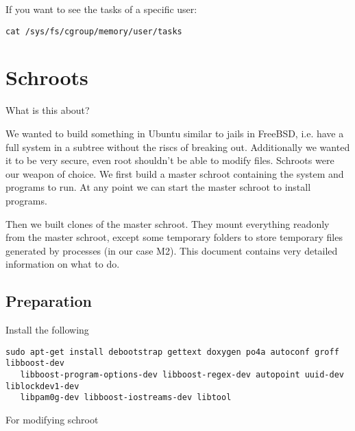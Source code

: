 \documentclass[a4paper]{book}
\begin{document}
If you want to see the tasks of a specific user:
\begin{verbatim}
cat /sys/fs/cgroup/memory/user/tasks
\end{verbatim}

\chapter{Schroots}
What is this about?

We wanted to build something in Ubuntu similar to jails in FreeBSD, i.e. have a
full system in a subtree without the riscs of breaking out.  Additionally we
wanted it to be very secure, even root shouldn't be able to modify files.
Schroots were our weapon of choice. We first build a master schroot containing
the system and programs to run. At any point we can start the master schroot to
install programs.

Then we built clones of the master schroot. They mount everything readonly from
the master schroot, except some temporary folders to store temporary files
generated by processes (in our case M2). This document contains very detailed
information on what to do.

\section{Preparation}

Install the following

\begin{verbatim}
sudo apt-get install debootstrap gettext doxygen po4a autoconf groff libboost-dev
   libboost-program-options-dev libboost-regex-dev autopoint uuid-dev liblockdev1-dev
   libpam0g-dev libboost-iostreams-dev libtool
\end{verbatim}

For modifying schroot
\end{document}
